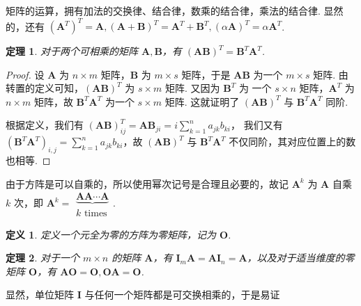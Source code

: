 \documentclass[a4paper]{article}
\newtheorem{theorem}{定理}[section]
\newtheorem{definition}{定义}[section]
\begin{document}
矩阵的运算，拥有加法的交换律、结合律，数乘的结合律，乘法的结合律. 显然的，还有 ${(\boldsymbol A^T)}^T=\boldsymbol A,(\boldsymbol A
    +\boldsymbol B)^T=\boldsymbol A^T+\boldsymbol B^T,(\alpha \boldsymbol A)^T=\alpha\boldsymbol A^T$.

\begin{theorem}
    对于两个可相乘的矩阵 $\boldsymbol A,\boldsymbol B$，有 $(\boldsymbol A\boldsymbol B)^T=\boldsymbol B^T\boldsymbol A^T$.
\end{theorem}

\begin{proof}
    设 $\boldsymbol A$ 为 $n\times m$ 矩阵，$\boldsymbol B$ 为 $m\times s$ 矩阵，于是 $\boldsymbol A\boldsymbol B$ 为一个
    $m\times s$ 矩阵. 由转置的定义可知，$(\boldsymbol A\boldsymbol B)^T$ 为 $s\times m$ 矩阵. 又因为 $\boldsymbol B^T$ 为
    一个 $s\times n$ 矩阵，$\boldsymbol A^T$ 为 $n\times m$ 矩阵，故 $\boldsymbol B^T\boldsymbol A^T$ 为一个 $s\times m$
    矩阵. 这就证明了 $(\boldsymbol A\boldsymbol B)^T$ 与 $\boldsymbol B^T\boldsymbol A^T$ 同阶.

    根据定义，我们有 $(\boldsymbol A\boldsymbol B)^T_{ij}=\boldsymbol A\boldsymbol B_{ji}=i\sum\limits_{k=1}^n a_{jk}b_{ki}$，
    我们又有 $(\boldsymbol B^T\boldsymbol A^T)_{i,j}=\sum\limits_{k=1}^n a_{jk}b_{ki}$，故 $(\boldsymbol A\boldsymbol B)^T$
    与 $\boldsymbol B^T\boldsymbol A^T$ 不仅同阶，其对应位置上的数也相等.
\end{proof}

由于方阵是可以自乘的，所以使用幂次记号是合理且必要的，故记 $\boldsymbol A^k$ 为 $\boldsymbol A$ 自乘 $k$ 次，即 $\boldsymbol A^k=\begin{matrix}
        \underbrace{\boldsymbol A\boldsymbol A\cdots\boldsymbol A} \\
        k\text{ times}
    \end{matrix}$.

\begin{definition}
    定义一个元全为零的方阵为零矩阵，记为 $\boldsymbol O$.
\end{definition}

\begin{theorem}
    对于一个 $m\times n$ 的矩阵 $\boldsymbol A$，有 $\boldsymbol I_m\boldsymbol A=\boldsymbol A
        \boldsymbol I_n=\boldsymbol A$，以及对于适当维度的零矩阵 $\boldsymbol O$，有 $\boldsymbol A
        \boldsymbol O=\boldsymbol O,\boldsymbol O\boldsymbol A=\boldsymbol O$.
\end{theorem}

显然，单位矩阵 $\boldsymbol I$ 与任何一个矩阵都是可交换相乘的，于是易证
\end{document}
